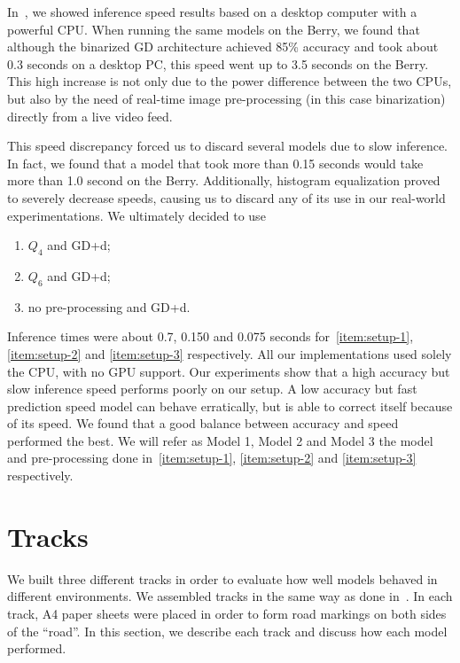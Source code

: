 In~, we showed inference speed results based on a desktop computer with a
powerful CPU. When running the same models on the Berry, we found that although the binarized GD
architecture achieved 85\% accuracy and took about 0.3 seconds on a desktop PC, this speed went up
to 3.5 seconds on the Berry. This high increase is not only due to the power difference between the
two CPUs, but also by the need of real-time image pre-processing (in this case binarization)
directly from a live video feed.

This speed discrepancy forced us to discard several models due to slow inference. In fact, we found
that a model that took more than 0.15 seconds would take more than 1.0 second on the Berry.
Additionally, histogram equalization proved to severely decrease speeds, causing us to discard any
of its use in our real-world experimentations. We ultimately decided to use

\begin{enumerate}
  \item\label{item:setup-1} $Q_4$ and GD+d;
  \item\label{item:setup-2} $Q_6$ and GD+d;
  \item\label{item:setup-3} no pre-processing and GD+d.
\end{enumerate}

Inference times were about 0.7, 0.150 and 0.075 seconds for~\autoref{item:setup-1},
\autoref{item:setup-2} and \autoref{item:setup-3} respectively. All our implementations used solely
the CPU, with no GPU support. Our experiments show that a high accuracy but slow inference speed
performs poorly on our setup. A low accuracy but fast prediction speed model can behave
erratically, but is able to correct itself because of its speed. We found that a good balance
between accuracy and speed performed the best. We will refer as Model 1, Model 2 and Model 3 the
model and pre-processing done in~\autoref{item:setup-1}, \autoref{item:setup-2} and
\autoref{item:setup-3} respectively.

\section{Tracks}

We built three different tracks in order to evaluate how well models behaved in different
environments.  We assembled tracks in the same way as done in~\cite{self-driving}. In each track,
A4 paper sheets were placed in order to form road markings on both sides of the ``road''. In this
section, we describe each track and discuss how each model performed.

